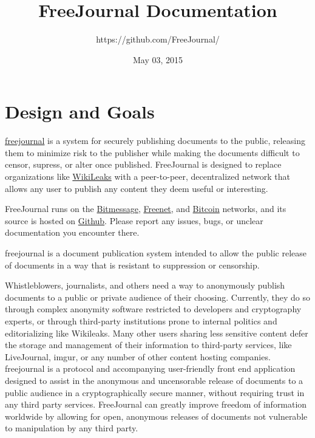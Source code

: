 \documentclass[letterpaper,10pt,oneside]{sphinxmanual}
\title{FreeJournal Documentation}
\date{May 03, 2015}
\author{https://github.com/FreeJournal/}
\begin{document}
\maketitle
\tableofcontents

\chapter{Design and Goals}
\label{design:welcome-to-freejournal-s-documentation}\label{design::doc}\label{design:design-and-goals}

\href{http://freejournal.org/}{freejournal} is a system for securely publishing documents to the public,
releasing them to minimize risk to the publisher while making the documents difficult to censor, supress, or
alter once published.  FreeJournal is designed to replace organizations like
\href{https://wikileaks.org/}{WikiLeaks} with a peer-to-peer, decentralized network that allows any
user to publish any content they deem useful or interesting.

FreeJournal runs on the \href{https://bitmessage.org/}{Bitmessage}, \href{https://freenetproject.org/}{Freenet},
and \href{https://bitcoin.org/}{Bitcoin} networks, and its source is hosted on
\href{https://github.com/FreeJournal/freejournal}{Github}.  Please report any issues, bugs, or unclear
documentation you encounter there.



freejournal is a document publication system intended to allow the public release of documents in a way that is resistant to
suppression or censorship.

Whistleblowers, journalists, and others need a way to anonymously publish documents to a public or private audience of their
choosing.  Currently, they do so through complex anonymity software restricted to developers and cryptography experts, or
through third-party institutions prone to internal politics and editorializing like Wikileaks.  Many other users sharing less
sensitive content defer the storage and management of their information to third-party services, like LiveJournal, imgur, or any
number of other content hosting companies.  freejournal is a protocol and accompanying user-friendly front end application
designed to assist in the anonymous and uncensorable release of documents to a public audience in a cryptographically secure
manner, without requiring trust in any third party services.  FreeJournal can greatly improve freedom of information worldwide
by allowing for open, anonymous releases of documents not vulnerable to manipulation by any third party.
\end{document}
